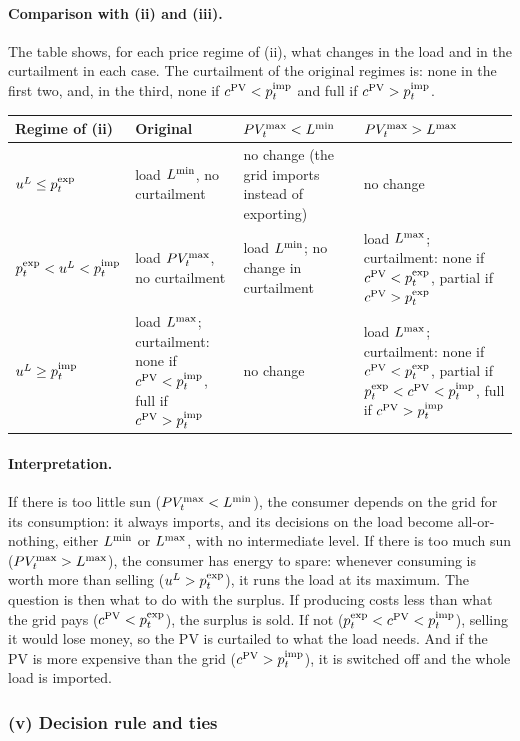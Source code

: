 \paragraph{Comparison with (ii) and (iii).}
The table shows, for each price regime of (ii), what changes in the load and in the
curtailment in each case. The curtailment of the original regimes is: none in the first two,
and, in the third, none if $c^{\mathrm{PV}} < p^{\mathrm{imp}}_{t}$ and full if $c^{\mathrm{PV}} > p^{\mathrm{imp}}_{t}$.
\begin{center}
\small
\begin{tabularx}{\textwidth}{lXXX}
    \toprule
    Regime of (ii) & Original & $PV_{t}^{\max} < L^{\min}$ & $PV_{t}^{\max} > L^{\max}$ \\
    \midrule
    $u^{L} \leq p^{\mathrm{exp}}_{t}$
    & load $L^{\min}$, no curtailment
    & no change (the grid imports instead of exporting)
    & no change \\
    $p^{\mathrm{exp}}_{t} < u^{L} < p^{\mathrm{imp}}_{t}$
    & load $PV_{t}^{\max}$, no curtailment
    & load $L^{\min}$; no change in curtailment
    & load $L^{\max}$; curtailment: none if $c^{\mathrm{PV}} < p^{\mathrm{exp}}_{t}$, partial if $c^{\mathrm{PV}} > p^{\mathrm{exp}}_{t}$ \\
    $u^{L} \geq p^{\mathrm{imp}}_{t}$
    & load $L^{\max}$; curtailment: none if $c^{\mathrm{PV}} < p^{\mathrm{imp}}_{t}$, full if $c^{\mathrm{PV}} > p^{\mathrm{imp}}_{t}$
    & no change
    & load $L^{\max}$; curtailment: none if $c^{\mathrm{PV}} < p^{\mathrm{exp}}_{t}$, partial if $p^{\mathrm{exp}}_{t} < c^{\mathrm{PV}} < p^{\mathrm{imp}}_{t}$, full
    if $c^{\mathrm{PV}} > p^{\mathrm{imp}}_{t}$ \\
    \bottomrule
\end{tabularx}
\end{center}

\paragraph{Interpretation.}
If there is too little sun ($PV_{t}^{\max} < L^{\min}$), the consumer depends on the grid for its
consumption: it always imports, and its decisions on the load become all-or-nothing, either
$L^{\min}$ or $L^{\max}$, with no intermediate level. If there is too much sun ($PV_{t}^{\max} > L^{\max}$),
the consumer has energy to spare: whenever consuming is worth more than selling
($u^{L} > p^{\mathrm{exp}}_{t}$), it runs the load at its maximum. The question is then what to do with the
surplus. If producing costs less than what the grid pays ($c^{\mathrm{PV}} < p^{\mathrm{exp}}_{t}$), the surplus is
sold. If not ($p^{\mathrm{exp}}_{t} < c^{\mathrm{PV}} < p^{\mathrm{imp}}_{t}$), selling it would lose money, so the PV is curtailed to
what the load needs. And if the PV is more expensive than the grid ($c^{\mathrm{PV}} > p^{\mathrm{imp}}_{t}$), it is
switched off and the whole load is imported.

\subsubsection{(v) Decision rule and ties}


